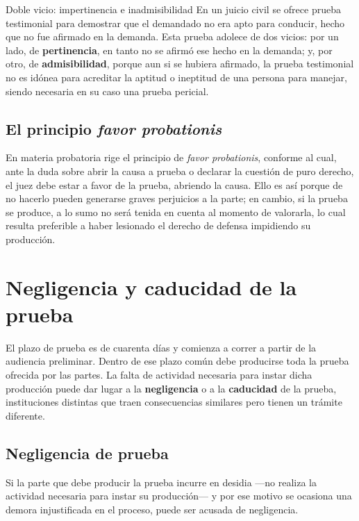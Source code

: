 \documentclass[12pt,oneside]{book}
\begin{document}
\begin{example}{Doble vicio: impertinencia e inadmisibilidad}
En un juicio civil se ofrece prueba testimonial para demostrar que el demandado no era apto para conducir, hecho que no fue afirmado en la demanda. Esta prueba adolece de dos vicios: por un lado, de \textbf{pertinencia}, en tanto no se afirmó ese hecho en la demanda; y, por otro, de \textbf{admisibilidad}, porque aun si se hubiera afirmado, la prueba testimonial no es idónea para acreditar la aptitud o ineptitud de una persona para manejar, siendo necesaria en su caso una prueba pericial.
\end{example}

\subsection{El principio \textit{favor probationis}}

En materia probatoria rige el principio de \textit{favor probationis}, conforme al cual, ante la duda sobre abrir la causa a prueba o declarar la cuestión de puro derecho, el juez debe estar a favor de la prueba, abriendo la causa. Ello es así porque de no hacerlo pueden generarse graves perjuicios a la parte; en cambio, si la prueba se produce, a lo sumo no será tenida en cuenta al momento de valorarla, lo cual resulta preferible a haber lesionado el derecho de defensa impidiendo su producción.

\section{Negligencia y caducidad de la prueba}

El plazo de prueba es de cuarenta días y comienza a correr a partir de la audiencia preliminar. Dentro de ese plazo común debe producirse toda la prueba ofrecida por las partes. La falta de actividad necesaria para instar dicha producción puede dar lugar a la \textbf{negligencia} o a la \textbf{caducidad} de la prueba, instituciones distintas que traen consecuencias similares pero tienen un trámite diferente.

\subsection{Negligencia de prueba}

Si la parte que debe producir la prueba incurre en desidia —no realiza la actividad necesaria para instar su producción— y por ese motivo se ocasiona una demora injustificada en el proceso, puede ser acusada de negligencia.
\end{document}
